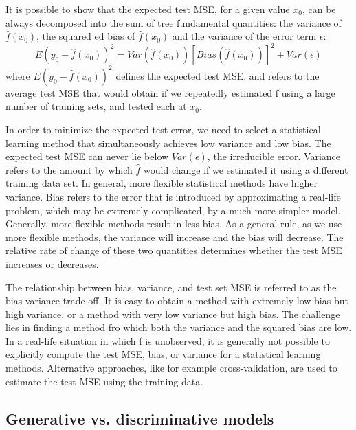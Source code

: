 {\color{red}

    It is possible to show that the expected test MSE, for a given value $x_{0}$, can be always decomposed into the sum of tree fundamental quantities: the variance of $\hat{f}\left(x_{0}\right)$, the squared ed bias of $\hat{f}\left(x_{0}\right)$ and the variance of the error term $\epsilon$:
    \[
        E\left(y_{0}-\hat{f}\left(x_{0}\right)\right)^{2}=Var\left(\hat{f}\left(x_{0}\right)\right)\left[Bias\left(\hat{f}\left(x_{0}\right)\right)\right]^{2}+Var\left(\epsilon\right)
    \]
    where $E\left(y_{0}-\hat{f}\left(x_{0}\right)\right)^{2}$ defines the expected test MSE, and refers to the average test MSE that would obtain if we repeatedly estimated f using a large number of training sets, and tested each at $x_{0}$.

    In order to minimize the expected test error, we need to select a statistical learning method that simultaneously achieves low variance and low bias. The expected test MSE can never lie below $Var\left(\epsilon\right)$, the irreducible error. Variance refers to the amount by which $\hat{f}$ would change if we estimated it using a different training data set. In general, more flexible statistical methods have higher variance. Bias refers to the error that is introduced by approximating a real-life problem, which may be extremely complicated, by a much more simpler model. Generally, more flexible methods result in less bias. As a general rule, as we use more flexible methods, the variance will increase and the bias will decrease. The relative rate of change of these two quantities determines whether the test MSE increases or decreases.

    The relationship between bias, variance, and test set MSE is referred to as the bias-variance trade-off. It is easy to obtain a method with extremely low bias but high variance, or a method with very low variance but high bias. The challenge lies in finding a method fro which both the variance and the squared bias are low. In a real-life situation in which f is unobserved, it is generally not possible to explicitly compute the test MSE, bias, or variance for a statistical learning methods. Alternative approaches, like for example cross-validation, are used to estimate the test MSE using the training data.

}

\subsection{Generative vs. discriminative models}
\label{sec:generative_discriminative}


